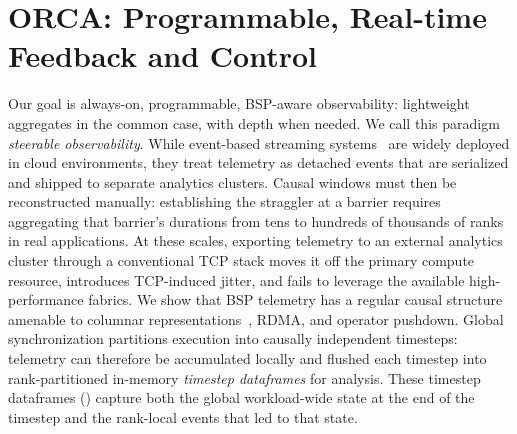 

\section{ORCA: Programmable, Real-time Feedback and Control}
\label{sec:intro:orca}

\enlargethispage{-2\baselineskip}

Our goal is always-on, programmable, BSP-aware observability: lightweight aggregates in the common
case, with depth when needed.
We call this paradigm \emph{steerable observability}.
While event-based streaming systems~\cite{Kreps2011:Kafka,Carbo2015:ApacheFlink} are widely
deployed in cloud
environments, they treat telemetry as detached events that are serialized and shipped to separate
analytics clusters.
Causal windows must then be reconstructed manually: establishing the straggler at a barrier
requires aggregating
that barrier's durations from tens to hundreds of thousands of ranks in real applications.
At these scales, exporting telemetry to an external analytics cluster through a conventional
TCP stack moves it off the
primary compute resource, introduces TCP-induced jitter, and fails to leverage the available
high-performance fabrics.
We show that BSP telemetry has a regular causal structure amenable to columnar
representations~\cite{:ApacheArrow},
RDMA, and operator pushdown.
Global synchronization partitions execution into causally independent timesteps: telemetry can
therefore be accumulated locally and flushed each timestep into rank-partitioned
in-memory \emph{timestep dataframes} for analysis.
These timestep dataframes () capture both the global workload-wide state
at the end of the timestep
and the
rank-local events that led to that state.

